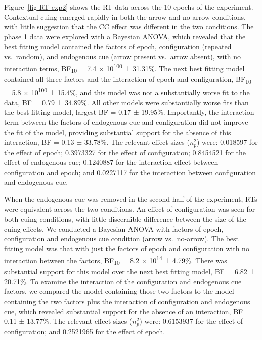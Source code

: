 \documentclass[
  man,
  floatsintext,
  longtable,
  nolmodern,
  notxfonts,
  notimes,
  colorlinks=true,linkcolor=blue,citecolor=blue,urlcolor=blue]{apa7}
\begin{document}
Figure~\ref{fig-RT-exp2} shows the RT data across the 10 epochs of the
experiment. Contextual cuing emerged rapidly in both the arrow and
no-arrow conditions, with little suggestion that the CC effect was
different in the two conditions. The phase 1 data were explored with a
Bayesian ANOVA, which revealed that the best fitting model contained the
factors of epoch, configuration (repeated vs.~random), and endogenous
cue (arrow present vs.~arrow absent), with no interaction terms,
BF\textsubscript{10} = 7.4 × 10\textsuperscript{100} ± 31.31\%. The next
best fitting model contained all three factors and the interaction of
epoch and configuration, BF\textsubscript{10} = 5.8 ×
10\textsuperscript{100} ± 15.4\%, and this model was not a substantially
worse fit to the data, BF = 0.79 ± 34.89\%. All other models were
substantially worse fits than the best fitting model, largest BF = 0.17
± 19.95\%. Importantly, the interaction term between the factors of
endogenous cue and configuration did not improve the fit of the model,
providing substantial support for the absence of this interaction, BF =
0.13 ± 33.78\%. The relevant effect sizes (\(n^2_p\)) were: 0.018597 for
the effect of epoch; 0.3973327 for the effect of configuration;
0.8454521 for the effect of endogenous cue; 0.1240887 for the
interaction effect between configuration and epoch; and 0.0227117 for
the interaction between configuration and endogenous cue.

When the endogenous cue was removed in the second half of the
experiment, RTs were equivalent across the two conditions. An effect of
configuration was seen for both cuing conditions, with little
discernible difference between the size of the cuing effects. We
conducted a Bayesian ANOVA with factors of epoch, configuration and
endogenous cue condition (arrow vs.~no-arrow). The best fitting model
was that with just the factors of epoch and configuration with no
interaction between the factors, BF\textsubscript{10} = 8.2 ×
10\textsuperscript{14} ± 4.79\%. There was substantial support for this
model over the next best fitting model, BF = 6.82 ± 20.71\%. To examine
the interaction of the configuration and endogenous cue factors, we
compared the model containing those two factors to the model containing
the two factors plus the interaction of configuration and endogenous
cue, which revealed substantial support for the absence of an
interaction, BF = 0.11 ± 13.77\%. The relevant effect sizes (\(n^2_p\))
were: 0.6153937 for the effect of configuration; and 0.2521965 for the
effect of epoch.
\end{document}
